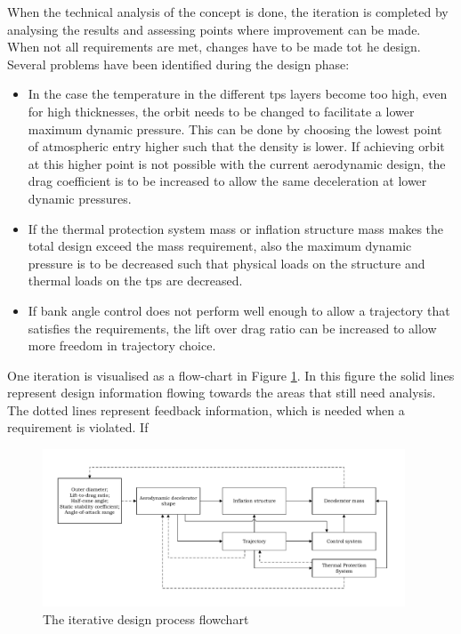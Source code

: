 When the technical analysis of the concept is done, the iteration is completed by analysing the results and assessing points where improvement can be made. When not all requirements are met, changes have to be made tot he design. Several problems have been identified during the design phase:
\begin{itemize}
	\item In the case the temperature in the different \gls{tps} layers become too high, even for high thicknesses, the orbit needs to be changed to facilitate a lower maximum dynamic pressure. This can be done by choosing the lowest point of atmospheric entry higher such that the density is lower. If achieving orbit at this higher point is not possible with the current aerodynamic design, the drag coefficient is to be increased to allow the same deceleration at lower dynamic pressures.
	
	\item If the thermal protection system mass or inflation structure mass makes the total design exceed the mass requirement, also the maximum dynamic pressure is to be decreased such that physical loads on the structure and thermal loads on the \gls{tps} are decreased.
	
	\item If bank angle control does not perform well enough to allow a trajectory that satisfies the requirements, the lift over drag ratio can be increased to allow more freedom in trajectory choice.
	
	
\end{itemize}

One iteration is visualised as a flow-chart in Figure \ref{fig:iterativedesignflowchart}. In this figure the solid lines represent design information flowing towards the areas that still need analysis. The dotted lines represent feedback information, which is needed when a requirement is violated. If 

\begin{figure}[h!]
		\vspace{-1cm}
		\includegraphics[width=0.96\textwidth]{./Figure/DesignIterationPhilosophy.pdf}
		\vspace{-2.3cm}
		\caption{The iterative design process flowchart}
		\label{fig:iterativedesignflowchart}
\end{figure}
